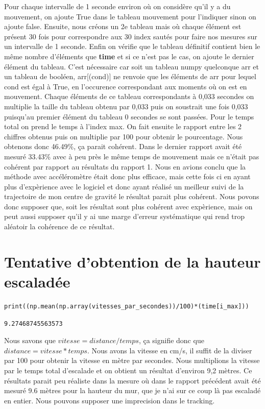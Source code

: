 \documentclass[11pt]{article}
\begin{document}
Pour chaque intervalle de 1 seconde environ où on considère qu'il y a du mouvement, on ajoute True dans le tableau mouvement pour l'indiquer sinon on
ajoute false. Ensuite, nous créons un 2e tableau mais où chaque élément est présent 30 fois pour correspondre aux 30 index sautés pour faire nos
mesures sur un intervalle de 1 seconde. Enfin on vérifie que le tableau définitif contient bien le même nombre d'éléments que \textbf{time} et si ce n'est
pas le cas, on ajoute le dernier élément du tableau. C'est nécessaire car soit un tableau numpy quelconque arr et un tableau de booléen, arr[(cond)]
ne renvoie que les éléments de arr pour lequel cond est égal à True, en l'occurence correspondant aux moments où on est en mouvement. Chaque éléments
de ce tableau correspondants à 0,033 secondes on multiplie la taille du tableau obtenu par 0,033 puis on soustrait une fois 0,033 puisqu'au premier
élément du tableau 0 secondes se sont passées. Pour le temps total on prend le temps à l'index max. On fait ensuite le rapport entre les 2 chiffres
obtenus puis on multiplie par 100 pour obtenir le pourcentage. Nous obtenons donc 46.49\%, ça parait cohérent. Dans le dernier rapport
avait été mesuré 33.43\% avec à peu près le même temps de mouvement mais ce n'était pas cohérent par rapport au résultats du rapport 1. Nous en avions
conclu que la méthode avec accéléromètre était donc plus efficace, mais cette fois ci en ayant plus d'expèrience avec le logiciel et donc ayant réalisé
un meilleur suivi de la trajectoire de mon centre de gravité le résultat parait plus cohérent. Nous povons donc supposer que, soit les résultat sont
plus cohérent avec expèrience, mais on peut aussi supposer qu'il y ai une marge d'erreur systématique qui rend trop aléatoir la cohérence de ce résultat.
\section{Tentative d'obtention de la hauteur escaladée}
\label{sec:org18c28a6}

\begin{verbatim}
print((np.mean(np.array(vitesses_par_secondes))/100)*(time[i_max]))
\end{verbatim}

\label{org23a6765}
\begin{verbatim}
9.27468745563573
\end{verbatim}


Nous savons que \(vitesse = distance/temps\), ça signifie donc que \(distance = vitesse*temps\). Nous avons la vitesse en cm/s, il suffit de la diviser
par 100 pour obtenir la vitesse en mètre par secondes. Nous multiplions la vitesse par le temps total d'escalade et on obtient un résultat d'environ
9,2 mètres. Ce résultats parait peu réaliste dans la mesure où dans le rapport précédent avait été mesuré 9.6 mètres pour la hauteur du mur, que je
n'ai sur ce coup là pas escaladé en entier. Nous pouvons supposer une imprecision dans le tracking.
\end{document}
